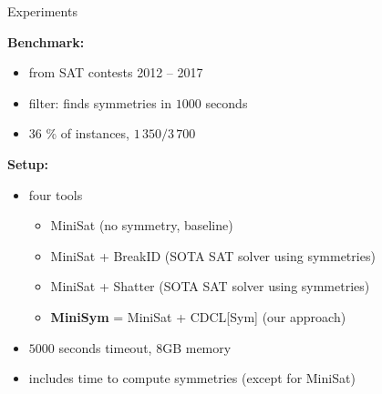 \documentclass{beamer}
\begin{document}
\begin{frame}{Experiments}

\textbf{Benchmark:}
\begin{itemize}
	\item from SAT contests 2012 -- 2017
	\item filter: \bliss{} finds symmetries in $1000$ seconds
	\item 36 \% of instances, $1\,350 / 3\,700$
\end{itemize}
\vfill
\textbf{Setup:}
\begin{itemize}
	\item four tools
	\begin{itemize}
		\item MiniSat (no symmetry, baseline)
		\item MiniSat + BreakID (SOTA SAT solver using symmetries)
		\item MiniSat + Shatter (SOTA SAT solver using symmetries)
		\item \textbf{MiniSym} = MiniSat + CDCL[Sym] (our approach)
	\end{itemize}
	\item $5000$ seconds timeout, $8$GB memory
	\item includes time to compute symmetries (except for MiniSat)
\end{itemize}

\end{frame}
\end{document}
